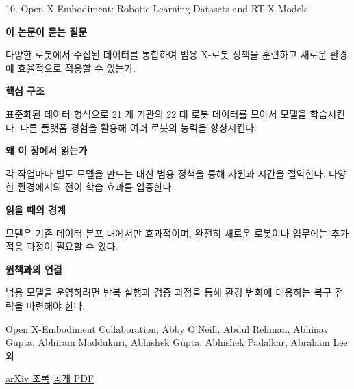 \documentclass[11pt,openany]{book}
\begin{document}
\begin{termcard}{10. Open X-Embodiment: Robotic Learning Datasets and RT-X Models}

\par

\medskip

{\sffamily\bfseries\color{deepblue} 이 논문이 묻는 질문}\par

다양한 로봇에서 수집된 데이터를 통합하여 범용 X-로봇 정책을 훈련하고 새로운 환경에 효율적으로 적응할 수 있는가.

\smallskip

{\sffamily\bfseries\color{deepblue} 핵심 구조}\par

표준화된 데이터 형식으로 21 개 기관의 22 대 로봇 데이터를 모아서 모델을 학습시킨다. 다른 플랫폼 경험을 활용해 여러 로봇의 능력을 향상시킨다.

\smallskip

{\sffamily\bfseries\color{deepblue} 왜 이 장에서 읽는가}\par

각 작업마다 별도 모델을 만드는 대신 범용 정책을 통해 자원과 시간을 절약한다. 다양한 환경에서의 전이 학습 효과를 입증한다.

\smallskip

{\sffamily\bfseries\color{coral} 읽을 때의 경계}\par

모델은 기존 데이터 분포 내에서만 효과적이며, 완전히 새로운 로봇이나 임무에는 추가 적응 과정이 필요할 수 있다.

\smallskip

{\sffamily\bfseries\color{teal} 원책과의 연결}\par

범용 모델을 운영하려면 반복 실행과 검증 과정을 통해 환경 변화에 대응하는 복구 전략을 마련해야 한다.

\medskip

{\footnotesize\color{muted} Open X-Embodiment Collaboration, Abby O'Neill, Abdul Rehman, Abhinav Gupta, Abhiram Maddukuri, Abhishek Gupta, Abhishek Padalkar, Abraham Lee 외\par

\href{https://arxiv.org/abs/2310.08864}{arXiv 초록} \quad \href{https://arxiv.org/pdf/2310.08864}{공개 PDF}\par}

\end{termcard}
\end{document}
